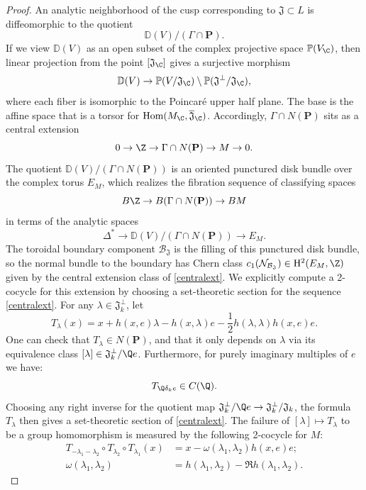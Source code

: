 \documentclass[11pt,letterpaper,english]{amsart}
\numberwithin{equation}{subsection}
\numberwithin{equation}{section}
\newcommand\cB{{\mathcal B}}
\newcommand\cN{{\mathcal N}}
\newcommand\bfP{{\mathbf P}}
\newcommand{\Hom}{\mathrm{Hom}}
\renewcommand{\P}{\mathbb P}
\theoremstyle{plain}
\theoremstyle{remark}
\begin{document}
\begin{proof}
    An analytic neighborhood of the cusp corresponding to $\mathfrak J\subset L$ is diffeomorphic to the quotient
    $$\mathbb D(V)/(\Gamma\cap \bfP).$$
    If we view $\mathbb D(V)$ as an open subset of the complex projective space $\P(V_\C)$, then linear projection from the point $[\mathfrak J_\C]$ gives a surjective morphism
    $$\mathbb D(V) \to \P(V/\mathfrak J_\C) \setminus \P(\mathfrak J^\bot/\mathfrak J_\C),$$
    where each fiber is isomorphic to the Poincar\'{e} upper half plane. The base is the affine space that is a torsor for $\Hom(M_\C, \overline{\mathfrak J}_\C)$. Accordingly, $\Gamma\cap N(\bfP)$ sits as a central extension
    \begin{equation}\label{centralext}0 \to \Z \to \Gamma\cap N(\bfP) \to M\to 0.\end{equation}
    The quotient $\mathbb D(V)/(\Gamma \cap N(\bfP))$ is an oriented punctured disk bundle over the complex torus
    $E_M$, which realizes the fibration sequence of classifying spaces 
    $$B\Z \to B(\Gamma \cap N(\bfP)) \to BM$$
    in terms of the analytic spaces
    $$\Delta^* \to \mathbb D(V)/(\Gamma \cap N(\bfP)) \to E_M.$$
    The toroidal boundary component $\cB_{\mathfrak J}$ is the filling of this punctured disk bundle, so the normal bundle to the boundary has Chern class $c_1(\cN_{\cB_{\mathfrak J}})\in \mathrm{H}^2(E_M,\Z)$ given by the central extension class of \ref{centralext}. We explicitly compute a 2-cocycle for this extension by choosing a set-theoretic section for the sequence \ref{centralext}. For any $\lambda\in \mathfrak J^\perp_k$, let
    $$T_\lambda(x) = x+ h(x,e)\lambda - h(x,\lambda) e - \frac{1}{2}h(\lambda,\lambda) h(x,e)e.$$
    One can check that $T_\lambda\in N(\bfP)$, and that it only depends on $\lambda$ via its equivalence class $[\lambda] \in \mathfrak J_k^\perp/\Q e$. Furthermore, for purely imaginary multiples of $e$ we have:
    $$T_{\Q\delta_k e} \in C(\Q).$$
    Choosing any right inverse for the quotient map $\mathfrak J_k^\perp/\Q e \to \mathfrak J_k^\perp/\mathfrak J_k$, the formula $T_\lambda$ then gives a set-theoretic section of \ref{centralext}.
    The failure of $[\lambda] \mapsto T_\lambda$ to be a group homomorphism is measured by the following 2-cocycle for $M$:
    \begin{align*}
        T_{-\lambda_1 - \lambda_2} \circ T_{\lambda_2}\circ T_{\lambda_1}(x) &= x  - \omega(\lambda_1,\lambda_2)h(x,e)e;\\
        \omega(\lambda_1,\lambda_2) &= h(\lambda_1,\lambda_2) - \Re h(\lambda_1,\lambda_2).

\end{align*}
\end{proof}
\end{document}

